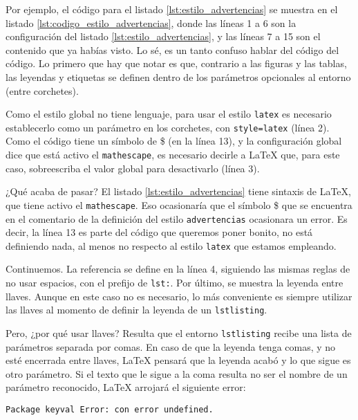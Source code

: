 Por ejemplo, el código para el listado \ref{lst:estilo_advertencias} se muestra en el listado \ref{lst:codigo_estilo_advertencias}, donde las líneas 1 a 6 son la configuración del listado \ref{lst:estilo_advertencias}, y las líneas 7 a 15 son el contenido que ya habías visto. Lo sé, es un tanto confuso hablar del código del código. Lo primero que hay que notar es que, contrario a las figuras y las tablas, las leyendas y etiquetas se definen dentro de los parámetros opcionales al entorno (entre corchetes).



Como el estilo global no tiene lenguaje, para usar el estilo \texttt{latex} es necesario establecerlo como un parámetro en los corchetes, con \texttt{style=latex} (línea 2). Como el código tiene un símbolo de \$ (en la línea 13), y la configuración global dice que está activo el \texttt{mathescape}, es necesario decirle a \LaTeX{} que, para este caso, sobreescriba el valor global para desactivarlo (línea 3).

¿Qué acaba de pasar? El listado \ref{lst:estilo_advertencias} tiene sintaxis de \LaTeX{}, que tiene activo el \texttt{mathescape}. Eso ocasionaría que el símbolo \$ que se encuentra en el comentario de la definición del estilo \texttt{advertencias} ocasionara un error. Es decir, la línea 13 es parte del código que queremos poner bonito, no está definiendo nada, al menos no respecto al estilo \texttt{latex} que estamos empleando.

Continuemos. La referencia se define en la línea 4, siguiendo las mismas reglas de no usar espacios, con el prefijo de \texttt{lst:}. Por último, se muestra la leyenda entre llaves. Aunque en este caso no es necesario, lo más conveniente es siempre utilizar las llaves al momento de definir la leyenda de un \texttt{lstlisting}.

Pero, ¿por qué usar llaves? Resulta que el entorno \texttt{lstlisting} recibe una lista de parámetros separada por comas. En caso de que la leyenda tenga comas, y no esté encerrada entre llaves, \LaTeX{} pensará que la leyenda acabó y lo que sigue es otro parámetro. Si el texto que le sigue a la coma resulta no ser el nombre de un parámetro reconocido, \LaTeX{} arrojará el siguiente error:

\begin{lstlisting}[style=errores]
Package keyval Error: con error undefined.
\end{lstlisting}


